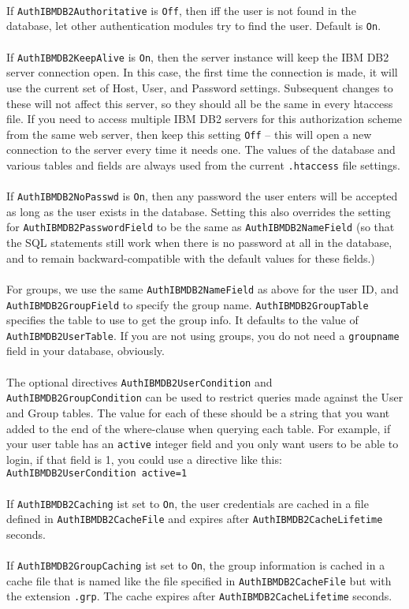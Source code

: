 \documentclass[11pt,a4paper]{article}
\begin{document}
\normalsize
\\\\
\\
If {\tt AuthIBMDB2Authoritative} is {\tt Off}, then iff the user is not found in the database, let other authentication modules try to find the user. Default is {\tt On}.\\
\\
If {\tt AuthIBMDB2KeepAlive} is {\tt On}, then the server instance will keep the IBM DB2 server connection open.  In this case, the first time the connection is made, it will use the current set of Host, User, and Password settings.  Subsequent changes to these will not affect this server, so they should all be the same in every htaccess file. 
If you need to access multiple IBM DB2 servers for this authorization scheme from the same web server, then keep this setting {\tt Off} -- this will open a new connection to the server every time it needs one.  The values of the database and various tables and fields are always used from the current {\tt .htaccess} file settings.\\
\\
If {\tt AuthIBMDB2NoPasswd} is {\tt On}, then any password the user enters will be accepted as long as the user exists in the database.  Setting this also overrides the setting for {\tt AuthIBMDB2PasswordField} to be the same as {\tt AuthIBMDB2NameField} (so that the SQL statements still work when there is no password at all in the database, and to remain backward-compatible with the default values for these fields.)\\
\\
For groups, we use the same {\tt AuthIBMDB2NameField} as above for the user ID, and {\tt AuthIBMDB2GroupField} to specify the group name. {\tt AuthIBMDB2GroupTable} specifies the table to use to get the group info.  It defaults to the value of {\tt AuthIBMDB2UserTable}.  If you are not using groups, you do not need a {\tt groupname} field in your database, obviously.\\
\\
The optional directives {\tt AuthIBMDB2UserCondition} and {\tt AuthIBMDB2GroupCondition} can be used to restrict queries made against the User and Group tables. The value for each of these should be a string that you want added to the end of the where-clause when querying each table.
For example, if your user table has an {\tt active} integer field and you only want users to be able to login, if that field is 1, you could use a directive like this:\\
{\tt AuthIBMDB2UserCondition active=1}\\
\\
If {\tt AuthIBMDB2Caching} ist set to {\tt On}, the user credentials are cached in a file defined in {\tt AuthIBMDB2CacheFile} and expires after {\tt AuthIBMDB2CacheLifetime} seconds.\\
\\
If {\tt AuthIBMDB2GroupCaching} ist set to {\tt On}, the group information is cached in a cache file that is named like the file specified in {\tt AuthIBMDB2CacheFile} but with the extension {\tt .grp}. The cache expires after {\tt AuthIBMDB2CacheLifetime} seconds.
\end{document}
